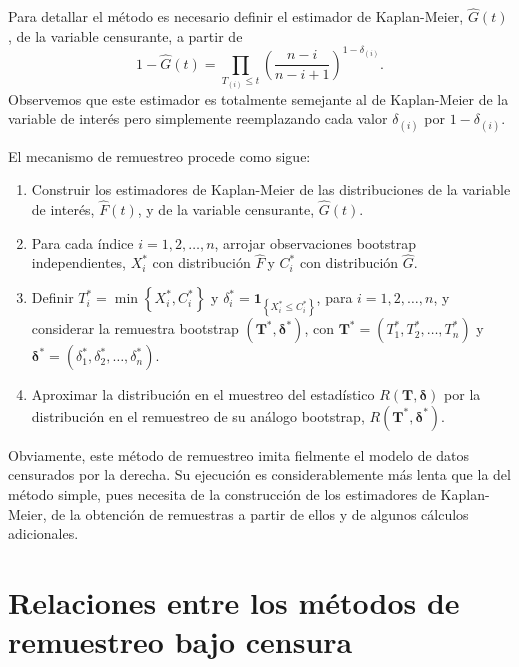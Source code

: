 \documentclass[
]{book}
\theoremstyle{break}
\theoremstyle{definition}
\theoremstyle{definition}
\theoremstyle{definition}
\theoremstyle{remark}
\begin{document}
Para detallar el método es necesario definir el estimador de
Kaplan-Meier, \(\hat{G}\left( t \right)\), de la variable censurante, a
partir
de\[1-\hat{G}\left( t \right) =\prod_{T_{(i)}\leq t}\left( \frac{n-i
}{n-i+1} \right)^{1-\delta _{(i)}}.\] Observemos que este
estimador es totalmente semejante al de Kaplan-Meier de la variable de
interés pero simplemente reemplazando cada valor
\(\delta _{(i)}\) por \(1-\delta _{(i)}\).

El mecanismo de remuestreo procede como sigue:

\begin{enumerate}
\def\labelenumi{\arabic{enumi}.}
\item
  Construir los estimadores de Kaplan-Meier de las distribuciones de
  la variable de interés, \(\hat{F}\left( t \right)\), y de la variable
  censurante, \(\hat{G}\left( t \right)\).
\item
  Para cada índice \(i=1,2,\ldots ,n\), arrojar observaciones bootstrap
  independientes, \(X_i^{\ast}\) con distribución \(\hat{F}\ \)y
  \(C_i^{\ast}\) con distribución \(\hat{G}\).
\item
  Definir \(T_i^{\ast}=\min \left\{ X_i^{\ast},C_i^{\ast}\right\}\) y
  \(\delta_i^{\ast}=\mathbf{1}_{\left\{ X_i^{\ast}\leq C_i^{\ast}\right\}}\), para \(i = 1, 2, \ldots, n\),
  y considerar la remuestra bootstrap
  \(\left( \mathbf{T}^{\ast},\boldsymbol{\delta}^{\ast}\right)\), con
  \(\mathbf{T}^{\ast}=\left( T_1^{\ast},T_2^{\ast}, \ldots, T_n^{\ast} \right)\) y \(\boldsymbol{\delta}^{\ast} = \left( \delta_1^{\ast}, \delta_2^{\ast},\ldots ,\delta_n^{\ast} \right)\).
\item
  Aproximar la distribución en el muestreo del estadístico
  \(R\left( \mathbf{T},\boldsymbol{\delta} \right)\) por la
  distribución en el remuestreo de su análogo bootstrap, \(R\left( \mathbf{T}^{\ast},\boldsymbol{\delta}^{\ast} \right)\).
\end{enumerate}

Obviamente, este método de remuestreo imita fielmente el modelo de datos
censurados por la derecha. Su ejecución es considerablemente más lenta
que la del método simple, pues necesita de la construcción de los
estimadores de Kaplan-Meier, de la obtención de remuestras a partir de
ellos y de algunos cálculos adicionales.

\hypertarget{relaciones-entre-los-muxe9todos-de-remuestreo-bajo-censura}{%
\section{Relaciones entre los métodos de remuestreo bajo censura}\label{relaciones-entre-los-muxe9todos-de-remuestreo-bajo-censura}}
\end{document}
